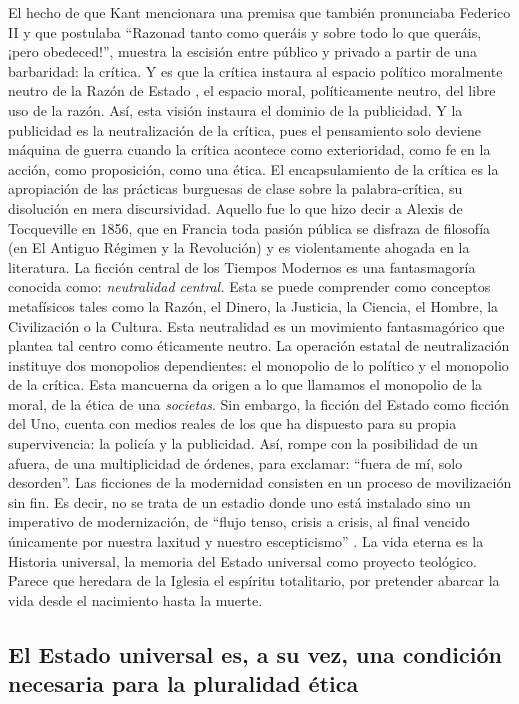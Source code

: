 El hecho de que Kant mencionara una premisa que también pronunciaba Federico II y que postulaba \enquote{Razonad tanto como queráis y sobre todo lo que queráis, ¡pero obedeced!}, muestra la escisión entre público y privado a partir de una barbaridad: la crítica. Y es que la crítica instaura al espacio político moralmente neutro de la Razón de Estado \autocite{deleuzeMilMesetasCapitalismo2002}, el espacio moral, políticamente neutro, del libre uso de la razón. Así, esta visión instaura el dominio de la publicidad. Y la publicidad es la neutralización de la crítica, pues el pensamiento solo deviene máquina de guerra cuando la crítica acontece como exterioridad, como fe en la acción, como proposición, como una ética. El encapsulamiento de la crítica es la apropiación de las prácticas burguesas de clase sobre la palabra-crítica, su disolución en mera discursividad. Aquello fue lo que hizo decir a Alexis de Tocqueville en 1856, que en Francia toda pasión pública se disfraza de filosofía (en El Antiguo Régimen y la Revolución) y es violentamente ahogada en la literatura. La ficción central de los Tiempos Modernos es una fantasmagoría conocida como: \emph{neutralidad central.} Esta se puede comprender como conceptos metafísicos tales como la Razón, el Dinero, la Justicia, la Ciencia, el Hombre, la Civilización o la Cultura. Esta neutralidad es un movimiento fantasmagórico que plantea tal centro como éticamente neutro. La operación estatal de neutralización instituye dos monopolios dependientes: el monopolio de lo político y el monopolio de la crítica. Esta mancuerna da origen a lo que llamamos el monopolio de la moral, de la ética de una \emph{societas}. Sin embargo, la ficción del Estado como ficción del Uno, cuenta con medios reales de los que ha dispuesto para su propia supervivencia: la policía y la publicidad. Así, rompe con la posibilidad de un afuera, de una multiplicidad de órdenes, para exclamar: \enquote{fuera de mí, solo desorden}. Las ficciones de la modernidad consisten en un proceso de movilización sin fin. Es decir, no se trata de un estadio donde uno está instalado sino un imperativo de modernización, de \enquote{flujo tenso, crisis a crisis, al final vencido únicamente por nuestra laxitud y nuestro escepticismo} \autocite[p.~33]{tiqqunIntroduccionGuerraCivil2008}. La vida eterna es la Historia universal, la memoria del Estado universal como proyecto teológico. Parece que heredara de la Iglesia el espíritu totalitario, por pretender abarcar la vida desde el nacimiento hasta la muerte.

\subsection{El Estado universal es, a su vez, una condición necesaria para la pluralidad ética}
\label{sub:el-estado-universal-es-una-condición-necesaria-para-la-pluralidad-ética}

